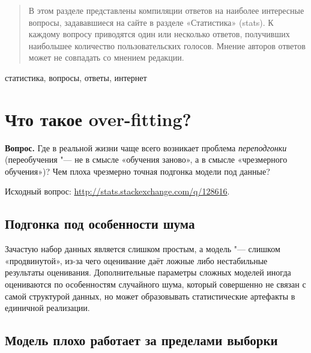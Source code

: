 \documentclass[11pt]{article}
\begin{document}


\DoFirstPageTechnicalStuff

\begin{abstract}
В этом разделе представлены компиляции ответов на наиболее интересные вопросы, задававшиеся на сайте  в разделе «Статистика» (stats). К каждому вопросу приводятся один или несколько ответов, получивших наибольшее количество пользовательских голосов. Мнение авторов ответов может не совпадать со мнением редакции.
\end{abstract}


\begin{keyword}
статистика, вопросы, ответы, интернет
\end{keyword}




\section{Что такое over-fitting?}

\textbf{Вопрос.} Где в реальной жизни чаще всего возникает проблема \textit{переподгонки} (переобучения "--- не в смысле «обучения заново», а в смысле «чрезмерного обучения»)? Чем плоха чрезмерно точная подгонка модели под данные?

Исходный вопрос: \url{http://stats.stackexchange.com/q/128616}.

\subsection{Подгонка под особенности шума}

Зачастую набор данных является слишком простым, а модель "--- слишком «продвинутой», из-за чего оценивание даёт ложные либо нестабильные результаты оценивания. Дополнительные параметры сложных моделей иногда оцениваются по особенностям случайного шума, который совершенно не связан с самой структурой данных, но может образовывать статистические артефакты в единичной реализации. 

\subsection{Модель плохо работает за пределами выборки}
\end{document}
